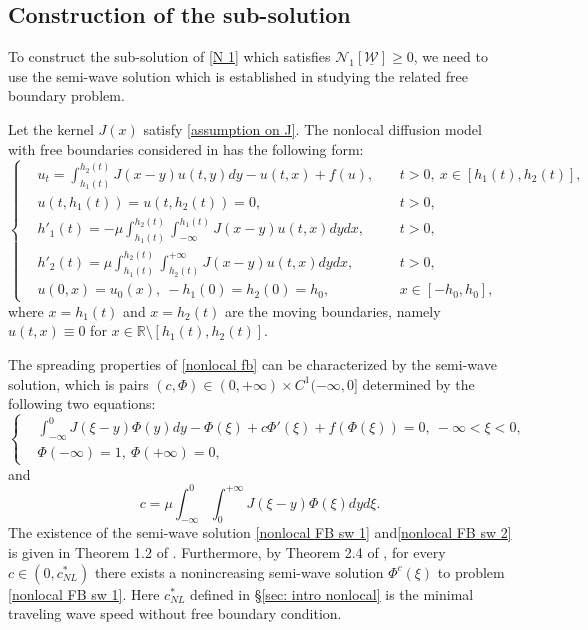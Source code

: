 \documentclass[11pt,a4paper]{article}
\numberwithin{equation}{section}
\numberwithin{figure}{section}
\begin{document}
\subsection{Construction of the sub-solution}
To construct the sub-solution of \eqref{N 1} which satisfies $\mathcal N_1[\underline{\mathcal W}]\ge 0$, we need to use the semi-wave solution which is established in studying the related free boundary problem. 

Let the kernel $J(x)$ satisfy \eqref{assumption on J}.
The nonlocal diffusion model with free boundaries considered in \cite{Du Li Zhou} has the following form:
\begin{equation}\label{nonlocal fb}
\left\{
\begin{aligned}
&u_t=\int_{h_1(t)}^{h_2(t)}J(x-y)u(t,y)dy-u(t,x)+f(u),&\ &t>0,\ x\in[h_1(t),h_2(t)],\\
&u(t,h_1(t))=u(t,h_2(t))=0,&\ &t>0,\\
&h'_1(t)=-\mu\int_{h_1(t)}^{h_2(t)}\int_{-\infty}^{h_1(t)}J(x-y)u(t,x)dydx,&\ &t>0,\\
&h'_2(t)=\mu\int_{h_1(t)}^{h_2(t)}\int^{+\infty}_{h_2(t)}J(x-y)u(t,x)dydx,&\ &t>0,\\
&u(0,x)=u_0(x),\ -h_1(0)=h_2(0)=h_0,&\ &x\in[-h_0,h_0],
\end{aligned}
\right.
\end{equation}
where $x=h_1(t)$ and $x=h_2(t)$ are the moving boundaries, namely $u(t,x)\equiv 0$ for $x\in\mathbb{R}\setminus[h_1(t),h_2(t)]$.

The spreading properties of \eqref{nonlocal fb} can be characterized by the semi-wave solution, which is pairs $(c,\Phi)\in (0,+\infty)\times C^1(-\infty,0]$ determined by the following two equations:
\begin{equation}\label{nonlocal FB sw 1}
\left\{
\begin{aligned}
&\int_{-\infty}^{0}J(\xi-y)\Phi(y)dy-\Phi(\xi)+c\Phi'(\xi)+f(\Phi(\xi))=0,\ -\infty<\xi<0,\\
&\Phi(-\infty)=1,\ \Phi(+\infty)=0,
\end{aligned}
\right.
\end{equation}
and
\begin{equation}\label{nonlocal FB sw 2}
c=\mu\int_{-\infty}^0\int_0^{+\infty}J(\xi-y)\Phi(\xi)dyd\xi.
\end{equation}
The existence of the semi-wave solution \eqref{nonlocal FB sw 1} and\eqref{nonlocal FB sw 2} is given in Theorem 1.2 of \cite{Du Li Zhou}. Furthermore, by Theorem 2.4 of \cite{Du Li Zhou}, for every $c\in(0,c^*_{NL})$ there exists a nonincreasing semi-wave solution $\Phi^c(\xi)$ to problem \eqref{nonlocal FB sw 1}. Here $c^*_{NL}$ defined in \S \ref{sec: intro nonlocal} is the minimal traveling wave speed without free boundary condition.
\end{document}
